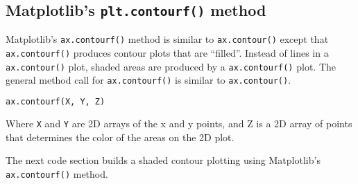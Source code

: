 \documentclass{book}
\newcommand{\passthrough}[1]{#1}
\begin{document}
    \begin{center}
    \end{center}
    { \hspace*{\fill} \\}
    

    
        \hypertarget{matplotlibs-plt.contourf-method}{%
\subsection{\texorpdfstring{Matplotlib's \texttt{plt.contourf()}
method}{Matplotlib's plt.contourf() method}}\label{matplotlibs-plt.contourf-method}}
    




    
        Matplotlib's \passthrough{\lstinline!ax.contourf()!} method is similar
to \passthrough{\lstinline!ax.contour()!} except that
\passthrough{\lstinline!ax.contourf()!} produces contour plots that are
``filled''. Instead of lines in a \passthrough{\lstinline!ax.contour()!}
plot, shaded areas are produced by a
\passthrough{\lstinline!ax.contourf()!} plot. The general method call
for \passthrough{\lstinline!ax.contourf()!} is similar to
\passthrough{\lstinline!ax.contour()!}.

\begin{lstlisting}[language=Python]
ax.contourf(X, Y, Z)
\end{lstlisting}

Where \passthrough{\lstinline!X!} and \passthrough{\lstinline!Y!} are 2D
arrays of the x and y points, and Z is a 2D array of points that
determines the color of the areas on the 2D plot.

The next code section builds a shaded contour plotting using
Matplotlib's \passthrough{\lstinline!ax.contourf()!} method.
    
\end{document}
